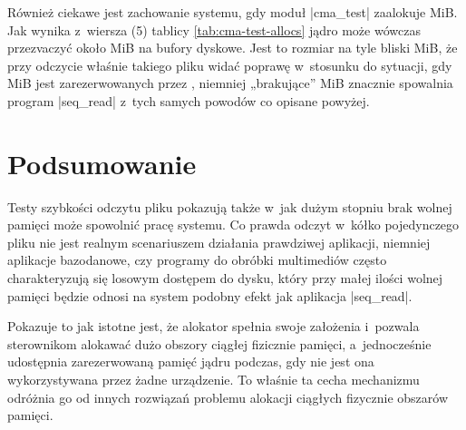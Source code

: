 Również ciekawe jest zachowanie systemu, gdy moduł \code|cma_test|
zaalokuje \unit[384]{MiB}.  Jak wynika z~wiersza (5) tablicy
\ref{tab:cma-test-allocs} jądro może wówczas przezvaczyć około
\unit[582]{MiB} na bufory dyskowe.  Jest to rozmiar na tyle bliski
\unit[600]{MiB}, że przy odczycie właśnie takiego pliku widać poprawę
w~stosunku do sytuacji, gdy \unit[512]{MiB} jest zarezerwowanych przez
, niemniej „brakujące” \unit[12]{MiB} znacznie spowalnia
program \code|seq_read| z~tych samych powodów co opisane powyżej.


\section{Podsumowanie}

Testy szybkości odczytu pliku pokazują także w~jak dużym stopniu brak
wolnej pamięci może spowolnić pracę systemu.  Co prawda odczyt w~kółko
pojedynczego pliku nie jest realnym scenariuszem działania prawdziwej
aplikacji, niemniej aplikacje bazodanowe, czy programy do obróbki
multimediów często charakteryzują się losowym dostępem do dysku, który
przy małej ilości wolnej pamięci będzie odnosi na system podobny
efekt jak aplikacja \code|seq_read|.

Pokazuje to jak istotne jest, że alokator  spełnia swoje
założenia i~pozwala sterownikom alokawać dużo obszory ciągłej
fizicznie pamięci, a~jednocześnie udostępnia zarezerwowaną pamięć
jądru podczas, gdy nie jest ona wykorzystywana przez żadne urządzenie.
To właśnie ta cecha mechanizmu  odróżnia go od innych
rozwiązań problemu alokacji ciągłych fizycznie obszarów pamięci.
